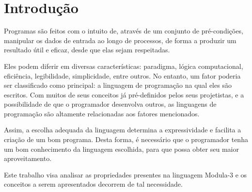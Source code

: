 \documentclass[brazil,times]{abnt}
\begin{document}





\data{\today}

\capa

\folhaderosto

\tableofcontents

\chapter{Introdução}
Programas são feitos com o intuito de, através de um conjunto de pré-condições, manipular os dados de entrada ao longo de processos, de forma a produzir um resultado útil e eficaz, desde que elas sejam respeitadas.

Eles podem diferir em diversas características: paradigma, lógica computacional, eficiência, legibilidade, simplicidade, entre outros. No entanto, um fator poderia ser classificado como principal: a linguagem de programação na qual eles são escritos. Com muitos de seus conceitos já pré-definidos pelos seus projetistas, e a possibilidade de que o programador desenvolva outros, as linguagens de programação são altamente relacionadas aos fatores mencionados.

Assim, a escolha adequada da linguagem determina a expressividade e facilita a criação de um bom programa. Desta forma, é necessário que o programador tenha um bom conhecimento da linguagem escolhida, para que possa obter seu maior aproveitamento.

Este trabalho visa analisar as propriedades presentes na linguagem Modula-3
e os conceitos a serem apresentados decorrem de tal necessidade. \cite{ana:livro} \cite{cardelli:Modula3LanguageDefinition}
 
\end{document}
